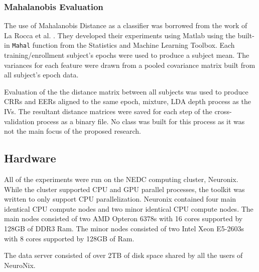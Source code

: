 \subsubsection{Mahalanobis Evaluation}

The use of Mahalanobis Distance as a classifier was borrowed from the work of La Rocca et al. \cite{Rocca2014}. They developed their experiments using Matlab using the built-in \texttt{Mahal} function from the Statistics and Machine Learning Toolbox. Each training/enrollment subject's epochs were used to produce a subject mean. The variances for each feature were drawn from a pooled covariance matrix built from all subject's epoch data.

Evaluation of the the distance matrix between all subjects was used to produce \acp{CRR} and \acp{EER} aligned to the same epoch, mixture, \ac{LDA} depth process as the \acp{IV}. The resultant distance matrices were saved for each step of the cross-validation process as a binary file. No class was built for this process as it was not the main focus of the proposed research.

\subsection{Hardware}

All of the experiments were run on the \ac{NEDC} computing cluster, Neuronix. While the cluster supported CPU and GPU parallel processes, the toolkit was written to only support CPU parallelization. Neuronix contained four main identical CPU compute nodes and two minor identical CPU compute nodes. The main nodes consisted of two AMD Opteron 6378s with 16 cores supported by 128GB of DDR3 Ram. The minor nodes consisted of two Intel Xeon E5-2603s with 8 cores supported by 128GB of Ram.

The data server consisted of over 2TB of disk space shared by all the users of NeuroNix.
